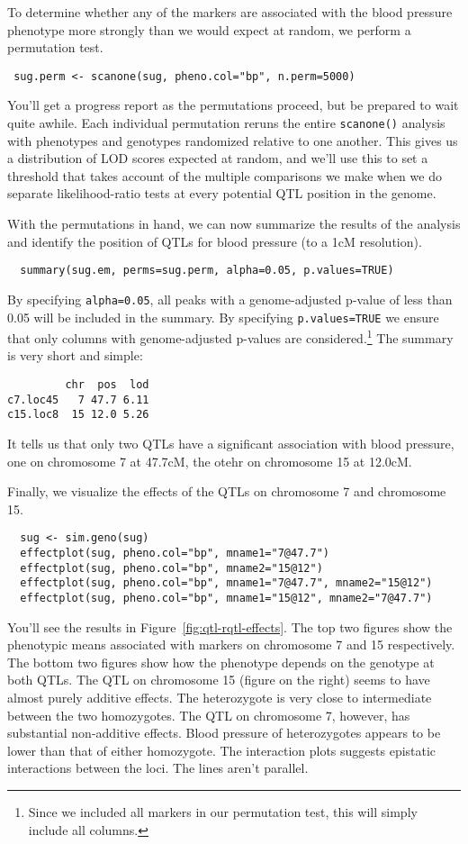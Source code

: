 To determine whether any of the markers are associated with the blood
pressure phenotype more strongly than we would expect at random, we
perform a permutation test.
\begin{verbatim}
 sug.perm <- scanone(sug, pheno.col="bp", n.perm=5000)
\end{verbatim}
You'll get a progress report as the permutations proceed, but be
prepared to wait quite awhile. Each individual permutation reruns the
entire {\tt scanone()} analysis with phenotypes and genotypes
randomized relative to one another. This gives us a distribution of
LOD scores expected at random, and we'll use this to set a threshold
that takes account of the multiple comparisons we make when we do
separate likelihood-ratio tests at every potential QTL position in the
genome.

With the permutations in hand, we can now summarize the results of the
analysis and identify the position of QTLs for blood pressure (to a
1cM resolution).
\begin{verbatim}
  summary(sug.em, perms=sug.perm, alpha=0.05, p.values=TRUE)
\end{verbatim}
By specifying {\tt alpha=0.05}, all peaks with a genome-adjusted
p-value of less than 0.05 will be included in the summary. By
specifying {\tt p.values=TRUE} we ensure that only columns with
genome-adjusted p-values are considered.\footnote{Since we included
  all markers in our permutation test, this will simply include all
  columns.} The summary is very short and simple:
\begin{verbatim}
         chr  pos  lod
c7.loc45   7 47.7 6.11
c15.loc8  15 12.0 5.26
\end{verbatim}
It tells us that only two QTLs have a significant association with
blood pressure, one on chromosome 7 at 47.7cM, the otehr on chromosome
15 at 12.0cM.

Finally, we visualize the effects of the QTLs on chromosome 7 and
chromosome 15.
\begin{verbatim}
  sug <- sim.geno(sug)
  effectplot(sug, pheno.col="bp", mname1="7@47.7")
  effectplot(sug, pheno.col="bp", mname2="15@12")
  effectplot(sug, pheno.col="bp", mname1="7@47.7", mname2="15@12")
  effectplot(sug, pheno.col="bp", mname1="15@12", mname2="7@47.7")
\end{verbatim}
You'll see the results in Figure~\ref{fig:qtl-rqtl-effects}. The top
two figures show the phenotypic means associated with markers on
chromosome 7 and 15 respectively. The bottom two figures show how the
phenotype depends on the genotype at both QTLs. The QTL on chromosome
15 (figure on the right) seems to have almost purely additive
effects. The heterozygote is very close to intermediate between the
two homozygotes. The QTL on chromosome 7, however, has substantial
non-additive effects. Blood pressure of heterozygotes appears to be
lower than that of either homozygote. The interaction plots suggests
epistatic interactions between the loci. The lines aren't parallel. 

